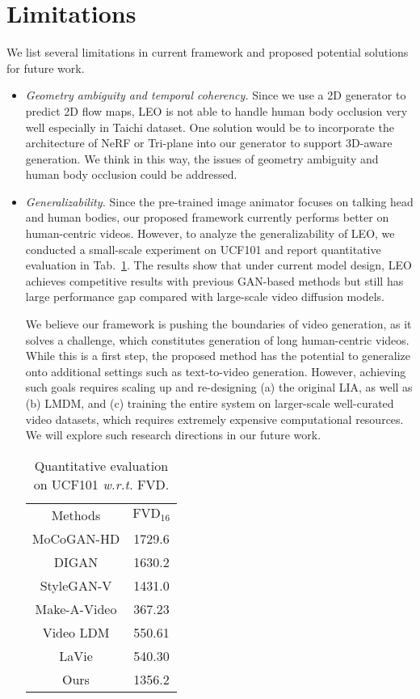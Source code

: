 \section{Limitations}
We list several limitations in current framework and proposed potential solutions for future work.
\begin{itemize}
\item \textit{Geometry ambiguity and temporal coherency.} Since we use a 2D generator to predict 2D flow maps, LEO is not able to handle human body occlusion very well especially in Taichi dataset. One solution would be to incorporate the architecture of NeRF or Tri-plane into our generator to support 3D-aware generation. We think in this way, the issues of geometry ambiguity and human body occlusion could be addressed.
\item \textit{Generalizability.} Since the pre-trained image animator focuses on talking head and human bodies, our proposed framework currently performs better on human-centric videos. However, to analyze the generalizability of LEO, we conducted a small-scale experiment on UCF101 and report quantitative evaluation in Tab.~{\ref{tab:ucf}}. The results show that under current model design, LEO achieves competitive results with previous GAN-based methods but still has large performance gap compared with large-scale video diffusion models. 

We believe our framework is pushing the boundaries of video generation, as it solves a challenge, which constitutes generation of long human-centric videos. While this is a first step, the proposed method has the potential to generalize onto additional settings such as text-to-video generation. However, achieving such goals requires scaling up and re-designing (a) the original LIA, as well as (b) LMDM, and (c) training the entire system on larger-scale well-curated video datasets, which requires extremely expensive computational resources. We will explore such research directions in our future work.

\begin{table}[!h]
\centering
\setlength{\tabcolsep}{25pt}
\setlength\arrayrulewidth{1pt}
\begin{tabular}{cc}
\hline
Methods & $\text{FVD}_{16}$ \\
\cmidrule{1-2}
MoCoGAN-HD & 1729.6  \\
DIGAN & 1630.2 \\
StyleGAN-V & 1431.0 \\
\cmidrule{1-2}
Make-A-Video & 367.23 \\
Video LDM & 550.61 \\
LaVie & 540.30 \\
\cmidrule{1-2}
Ours & 1356.2 \\
\hline
\end{tabular}
\caption{Quantitative evaluation on UCF101 \textit{w.r.t.} FVD.}
\label{tab:ucf}
\end{table}


\end{itemize}
